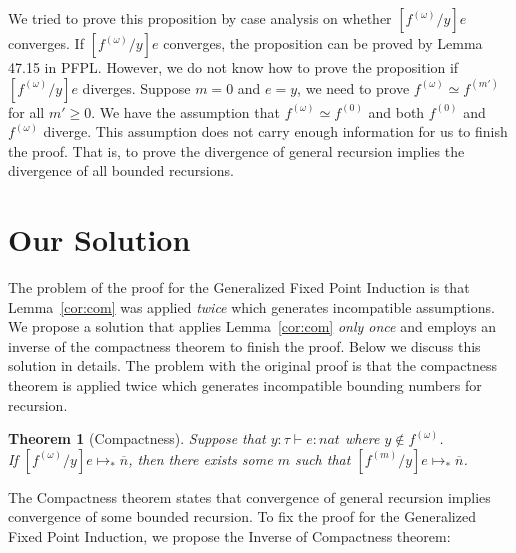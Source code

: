 \documentclass{article}
\newtheorem{theorem}{Theorem}
\begin{document}
We tried to prove this proposition by case analysis on whether
$[f^{(\omega)}/y]e$ converges.
If $[f^{(\omega)}/y]e$ converges, the proposition can be proved by Lemma 47.15 in PFPL.
However, we do not know how to prove
the proposition if $[f^{(\omega)}/y]e$ diverges.
Suppose $m = 0$ and $e = y$, we need to prove
$f^{(\omega)}\simeq f^{(m')}$ for all $m'\ge 0$.
We have the assumption that
$f^{(\omega)}\simeq f^{(0)}$ and both $f^{(0)}$ and $f^{(\omega)}$ diverge.
This assumption does not carry enough information for us to finish the proof. 
That is, to prove the divergence of general recursion implies the divergence of all bounded recursions.

\section{Our Solution}
\label{sec:solution}

The problem of the proof for the Generalized Fixed Point Induction is
that Lemma~\ref{cor:com} was applied \emph{twice} which generates
incompatible assumptions. We propose a solution that applies
Lemma~\ref{cor:com} \emph{only once} and employs an inverse of the compactness
theorem to finish the proof. Below we discuss this solution in details.
The problem with the original proof is that the compactness theorem is applied twice which generates incompatible bounding numbers for recursion.

\begin{theorem}[Compactness]
  Suppose that $y:\tau\vdash e:\textit{nat}$ where $y\notin f^{(\omega)}$. \\
  If $[f^{(\omega)}/y]e\longmapsto_*\overline{n}$, then there exists some $m$ such that $[f^{(m)}/y]e\longmapsto_*\overline{n}$.
\end{theorem}

The Compactness theorem states that convergence of general recursion implies convergence of some bounded recursion.
To fix the proof for the Generalized Fixed Point Induction, we propose the Inverse of Compactness theorem:
\end{document}
